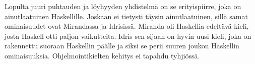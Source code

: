 \documentclass[finnish]{tktltiki2}
\begin{document}
Lopulta juuri puhtauden ja löyhyyden yhdistelmä on se erityispiirre, joka on ainutlaatuinen
Haskellille. Joskaan ei tietysti täysin ainutlaatuinen, sillä samat ominaisuudet ovat Mirandassa ja
Idrisissä. Miranda oli Haskellia edeltävä kieli, josta Haskell otti paljon vaikutteita. Idris sen
sijaan on hyvin uusi kieli, joka on rakennettu suoraan Haskellin päälle ja siksi se perii suuren
joukon Haskellin ominaisuuksia. Ohjelmointikielten kehitys ei tapahdu tyhjiössä.
\end{document}
